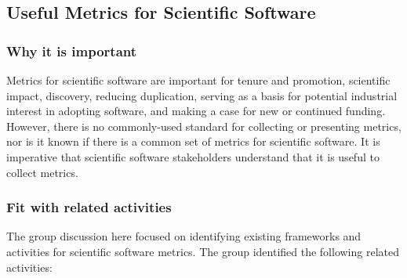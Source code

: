 \subsection{Useful Metrics for Scientific Software}
\label{sec:software-metrics}

\subsubsection{Why it is important}

Metrics for scientific software are important for tenure and promotion, scientific impact, discovery, reducing duplication, serving as a basis for potential industrial interest in adopting software, and making a case for new or continued funding.  However, there is no commonly-used standard for collecting or presenting metrics, nor is it known if there is a common set of metrics for scientific software.  It is imperative that scientific software stakeholders understand that it is useful to collect metrics.

\subsubsection{Fit with related activities}

The group discussion here focused on identifying existing frameworks and activities for scientific software metrics.  The group identified the following related activities:

